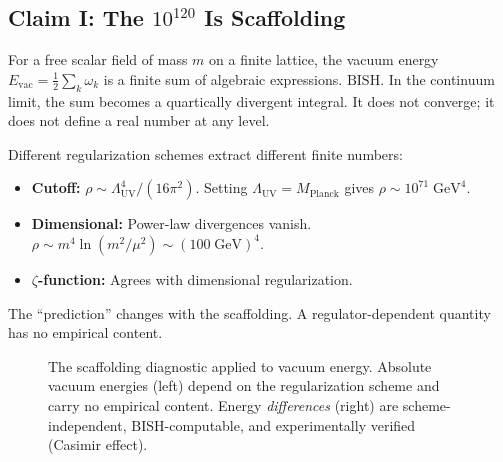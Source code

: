 \documentclass[11pt,a4paper]{article}
\theoremstyle{plain}
\theoremstyle{definition}
\newcommand{\BISH}{\ensuremath{\mathrm{BISH}}}
\newcommand{\MPl}{M_{\mathrm{Planck}}}
\begin{document}
\subsection{Claim I: The $10^{120}$ Is Scaffolding}

For a free scalar field of mass $m$ on a finite lattice, the vacuum
energy $E_{\mathrm{vac}} = \frac{1}{2}\sum_k \omega_k$ is a finite
sum of algebraic expressions.  $\BISH$.  In the continuum limit,
the sum becomes a quartically divergent integral.  It does not
converge; it does not define a real number at any level.

Different regularization schemes extract different finite numbers:
\begin{itemize}[nosep]
\item \textbf{Cutoff:} $\rho \sim \Lambda_{\mathrm{UV}}^4/(16\pi^2)$.
  Setting $\Lambda_{\mathrm{UV}} = \MPl$ gives $\rho \sim 10^{71}\;\mathrm{GeV}^4$.
\item \textbf{Dimensional:} Power-law divergences vanish.
  $\rho \sim m^4 \ln(m^2/\mu^2) \sim (100\;\mathrm{GeV})^4$.
\item \textbf{$\zeta$-function:} Agrees with dimensional regularization.
\end{itemize}
The ``prediction'' changes with the scaffolding.  A regulator-dependent
quantity has no empirical content.

\begin{figure}[ht]
\centering
{}
\caption{The scaffolding diagnostic applied to vacuum energy.
  Absolute vacuum energies (left) depend on the regularization
  scheme and carry no empirical content.
  Energy \emph{differences} (right) are scheme-independent,
  $\BISH$-computable, and experimentally verified (Casimir effect).}
\label{fig:scaffolding}
\end{figure}
\end{document}
